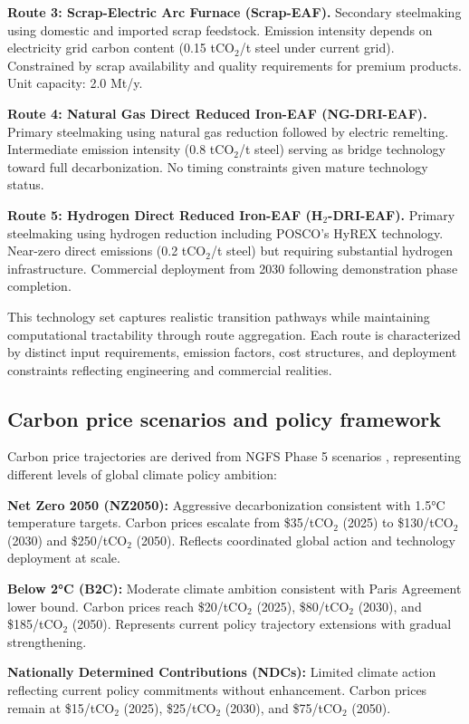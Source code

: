 \documentclass[preprint,1p,authoryear]{elsarticle}
\begin{document}
\textbf{Route 3: Scrap-Electric Arc Furnace (Scrap-EAF).} Secondary steelmaking using domestic and imported scrap feedstock. Emission intensity depends on electricity grid carbon content (0.15 tCO$_2$/t steel under current grid). Constrained by scrap availability and quality requirements for premium products. Unit capacity: 2.0 Mt/y.

\textbf{Route 4: Natural Gas Direct Reduced Iron-EAF (NG-DRI-EAF).} Primary steelmaking using natural gas reduction followed by electric remelting. Intermediate emission intensity (0.8 tCO$_2$/t steel) serving as bridge technology toward full decarbonization. No timing constraints given mature technology status.

\textbf{Route 5: Hydrogen Direct Reduced Iron-EAF (H$_2$-DRI-EAF).} Primary steelmaking using hydrogen reduction including POSCO's HyREX technology. Near-zero direct emissions (0.2 tCO$_2$/t steel) but requiring substantial hydrogen infrastructure. Commercial deployment from 2030 following demonstration phase completion.

This technology set captures realistic transition pathways while maintaining computational tractability through route aggregation. Each route is characterized by distinct input requirements, emission factors, cost structures, and deployment constraints reflecting engineering and commercial realities.

\subsection{Carbon price scenarios and policy framework}

Carbon price trajectories are derived from NGFS Phase 5 scenarios \citep{NGFS2024}, representing different levels of global climate policy ambition:

\textbf{Net Zero 2050 (NZ2050):} Aggressive decarbonization consistent with 1.5°C temperature targets. Carbon prices escalate from \$35/tCO$_2$ (2025) to \$130/tCO$_2$ (2030) and \$250/tCO$_2$ (2050). Reflects coordinated global action and technology deployment at scale.

\textbf{Below 2°C (B2C):} Moderate climate ambition consistent with Paris Agreement lower bound. Carbon prices reach \$20/tCO$_2$ (2025), \$80/tCO$_2$ (2030), and \$185/tCO$_2$ (2050). Represents current policy trajectory extensions with gradual strengthening.

\textbf{Nationally Determined Contributions (NDCs):} Limited climate action reflecting current policy commitments without enhancement. Carbon prices remain at \$15/tCO$_2$ (2025), \$25/tCO$_2$ (2030), and \$75/tCO$_2$ (2050).
\end{document}
